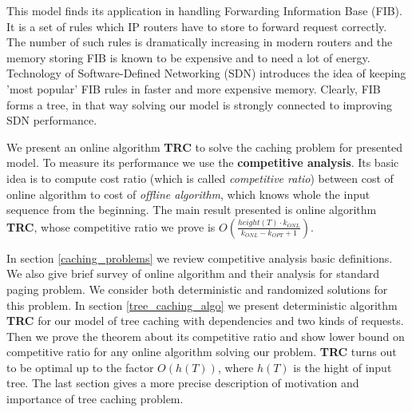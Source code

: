 This model finds its application in handling Forwarding Information Base (FIB). 
It is a set of rules which IP routers have to store to forward request 
correctly. The number of such rules is dramatically increasing in modern 
routers and the memory storing FIB is known to be expensive and to need a lot 
of energy. Technology of Software-Defined Networking (SDN) introduces the idea 
of keeping 'most popular' FIB rules in faster and more expensive memory. 
Clearly, FIB forms a tree, in that way solving our model is strongly connected 
to improving SDN performance.

We present an online algorithm \textbf{TRC} to solve the caching problem 
for presented model. To measure its performance we use the \textbf{competitive 
analysis}. Its basic idea is to compute cost ratio (which is called 
\textit{competitive ratio}) between cost of online algorithm to cost of 
\textit{offline algorithm}, which knows whole the input sequence from the 
beginning. The main result presented is online algorithm \textbf{TRC}, whose 
competitive ratio we prove is $O(\frac{height(T) \cdot k_{ONL}}{k_{ONL} - k_{OPT} 
+ 1})$.

In section \ref{caching_problems} we review competitive analysis basic 
definitions. We also give brief survey of online algorithm and their analysis 
for standard paging problem. We consider both deterministic and randomized 
solutions for this problem. In section \ref{tree_caching_algo} we present 
deterministic algorithm \textbf{TRC} for our model of tree caching with 
dependencies and two kinds of requests. Then we prove the theorem about its 
competitive ratio and show lower bound on competitive ratio for any online 
algorithm solving our problem. \textbf{TRC} turns out to be optimal up to the 
factor $O(h(T))$, where $h(T)$ is the hight of input tree. The last section 
gives a more precise description of motivation and importance of tree caching 
problem.
